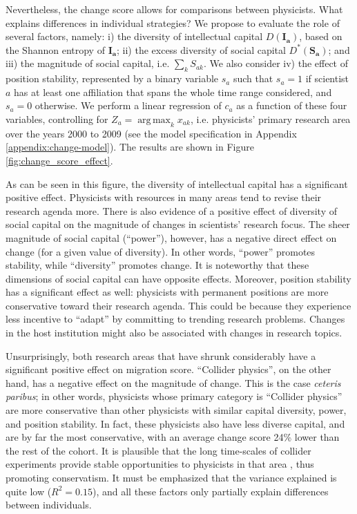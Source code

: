 \documentclass{article}
\DeclareMathOperator*{\argmax}{arg\,max}
\begin{document}
Nevertheless, the change score allows for comparisons between physicists. What explains differences in individual strategies? We propose to evaluate the role of several factors, namely: i) the diversity of intellectual capital $D(\bm{I_a})$, based on the Shannon entropy of $\bm{I_a}$; ii) the excess diversity of social capital $D^{\ast}(\bm{S_a})$; and iii) the magnitude of social capital, i.e. $\sum_k S_{ak}$. We also consider iv) the effect of position stability, represented by a binary variable $s_a$ such that $s_a=1$ if scientist $a$ has at least one affiliation that spans the whole time range considered, and $s_a=0$ otherwise. We perform a linear regression of $c_a$ as a function of these four variables, controlling for $Z_a=\argmax_{k} x_{ak}$, i.e. physicists' primary research area over the years 2000 to 2009 (see the model specification in Appendix \ref{appendix:change-model}). The results are shown in Figure \ref{fig:change_score_effect}.

As can be seen in this figure, the diversity of intellectual capital has a significant positive effect. Physicists with resources in many areas tend to revise their research agenda more. There is also evidence of a positive effect of diversity of social capital on the magnitude of changes in scientists' research focus. The sheer magnitude of social capital (``power''), however, has a negative direct effect on change (for a given value of diversity). In other words, ``power'' promotes stability, while ``diversity'' promotes change. It is noteworthy that these dimensions of social capital can have opposite effects. Moreover, position stability has a significant effect as well: physicists with permanent positions are more conservative toward their research agenda. This could be because they experience less incentive to ``adapt'' by committing to trending research problems. Changes in the host institution might also be associated with changes in research topics.

Unsurprisingly, both research areas that have shrunk considerably have a significant positive effect on migration score. ``Collider physics'', on the other hand, has a negative effect on the magnitude of change. This is the case \textit{ceteris paribus}; in other words, physicists whose primary category is ``Collider physics'' are more conservative than other physicists with similar capital diversity, power, and position stability. In fact, these physicists also have less diverse capital, and are by far the most conservative, with an average change score 24\% lower than the rest of the cohort. It is plausible that the long time-scales of collider experiments provide stable opportunities to physicists in that area \citep[p.~138]{galison1987how}, thus promoting conservatism. It must be emphasized that the variance explained is quite low ($R^2=0.15$), and all these factors only partially explain differences between individuals.
\end{document}
